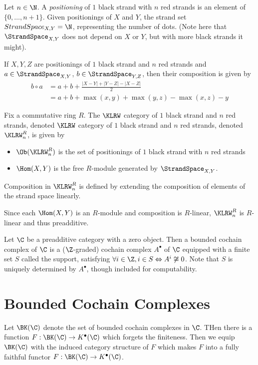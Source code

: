 \begin{definition}
  Let $n\in \N$. A \emph{positioning} of $1$ black strand with $n$ red strands is
  an element of $\{0, \ldots, n+1\}$. Given positionings of $X$
  and $Y$, the strand set $StrandSpace_{X, Y} = \N$, representing
  the number of dots. (Note here that $\StrandSpace_{X, Y}$ does not depend on
  $X$ or $Y$, but with more black strands it might).
\end{definition}

\begin{definition}
  If $X, Y, Z$ are positionings of $1$ black strand and $n$ red strands
  and $a\in \StrandSpace_{X, Y}$, $b\in \StrandSpace_{Y, Z}$, then their
  composition is given by
  \begin{align*}
    b\circ a &= a + b + \frac{|X-Y| + |Y-Z| - |X-Z|}{2}
    \\ &= a + b + \max (x, y) + \max (y, z) - \max (x, z) - y
  \end{align*}
\end{definition}

\begin{definition}
  Fix a commutative ring $R$. The $\KLRW$ category of $1$ black strand
  and $n$ red strands, denoted $\KLRW$ category of $1$ black strand
  and $n$ red strands, denoted $\KLRW^R_n$, is given by
  \begin{itemize}
    \item $\Ob(\KLRW^R_n)$ is the set of positionings of $1$ black strand
    with $n$ red strands
    \item $\Hom(X, Y)$ is the free $R$-module generated by $\StrandSpace_{X, Y}$.
  \end{itemize}
  Composition in $\KLRW^R_n$ is defined by extending the composition of elements of the strand
  space linearly.

  Since each $\Hom(X, Y)$ is an $R$-module and composition is $R$-linear, $\KLRW^R_n$
  is $R$-linear and thus preadditive.
\end{definition}
\begin{definition}
  Let $\C$ be a preadditive category with a zero object. Then a bounded cochain
  complex of $\C$ is a ($\Z$-graded) cochain complex $A^\bullet$ of $\C$ equipped with a finite set
  $S$ called the support, satisfying
  $\forall i\in \Z, i\in S \Leftrightarrow A^i\not\cong 0$. Note that
  $S$ is uniquely determined by $A^\bullet$, though included
  for computability.
\end{definition}

\section{Bounded Cochain Complexes}
\begin{definition}
  Let $\BK(\C)$ denote the set of bounded cochain complexes in $\C$. THen
  there is a function $F:\BK(\C)\to K^\bullet(\C)$ which forgets the finiteness.
  Then we equip $\BK(\C)$ with the induced category structure of $F$ which makes
  $F$ into a fully faithful functor $F:\BK(\C) \to K^\bullet (\C)$.
\end{definition}

